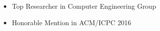 \documentclass[11pt,a4paper,roman,colorlinks,linkcolor=blue,filecolor=magenta,urlcolor=cyan]{moderncv}        %
\begin{document}
\begin{minipage}{\maincolumnwidth}
{\begin{itemize}
    			\item {Top Researcher in Computer Engineering Group}%
                \item {Honorable Mention in ACM/ICPC 2016}%
		\end{itemize}}%
\end{minipage}%

\end{document}
